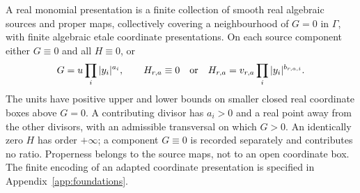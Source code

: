 \begin{definition}\label{def:monomial}
A real monomial presentation is a finite collection of smooth real
algebraic sources and proper maps, collectively covering a neighbourhood
of $G=0$ in $\Gamma$, with finite algebraic etale coordinate
presentations. On each source component either $G\equiv0$ and all
$H\equiv0$, or
\begin{equation}\label{eq:monomial}
 G=u\prod_i|y_i|^{a_i},\qquad
 H_{r,a}\equiv0\quad\hbox{or}\quad
 H_{r,a}=v_{r,a}\prod_i|y_i|^{b_{r,a,i}}.
\end{equation}
The units have positive upper and lower bounds on smaller closed real
coordinate boxes above $G=0$. A contributing divisor has $a_i>0$ and
a real point away from the other divisors, with an admissible transversal
on which $G>0$. An identically zero $H$ has order $+\infty$; a component
$G\equiv0$ is recorded separately and contributes no ratio. Properness
belongs to the source maps, not to an open coordinate box. The finite
encoding of an adapted coordinate presentation is specified in
Appendix~\ref{app:foundations}.
\end{definition}

